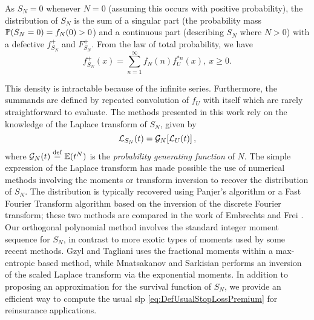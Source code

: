 As $S_N=0$ whenever $N=0$ (assuming this occurs with positive probability), the distribution of $S_N$ is the sum of a singular part (the probability mass $\P(S_N=0)=f_N(0)>0$) and a continuous part (describing $S_N$ where $N>0$) with a defective \pdf $f_{S_N}^+$ and \cdf $F_{S_N}^+$. From the law of total probability, we have
\begin{equation}\label{eq:DefectivePDFCompoundDistribution}
f_{S_N}^+(x)=\sum_{n=1}^{\infty}f_N(n)f_{U}^{\ast n}(x),~x\geq0.
\end{equation}

This density is intractable because of the infinite series. Furthermore, the summands are defined by repeated convolution of $f_{U}$ with itself which are rarely straightforward to evaluate. The methods presented in this work rely on the knowledge of the Laplace transform of $S_N$, given by
\begin{equation*}\label{eq:TransformsForCompoundDistribution}
\LTsub{S_N}(t) = \PGF_N[ \LTsub{U}(t) ] \,,
\end{equation*}
where $\PGF_N(t) \defeq \E (t^N)$ is the \emph{probability generating function} of $N$. The simple expression of the Laplace transform has made possible the use of numerical methods involving the moments or transform inversion to recover the distribution of $S_N$. The distribution is typically recovered using Panjer's algorithm or a Fast Fourier Transform algorithm based on the inversion of the discrete Fourier transform; these two methods are compared in the work of Embrechts and Frei \cite{EmFr09}. Our orthogonal polynomial method involves the standard integer moment sequence for $S_N$, in contrast to more exotic types of moments used by some recent methods. Gzyl and Tagliani \cite{GzTa12} uses the fractional moments within a max-entropic based method, while Mnatsakanov and Sarkisian \cite{MnSa13} performs an inversion of the scaled Laplace transform via the exponential moments. In addition to proposing an approximation for the survival function of $S_N$, we provide an efficient way to compute the usual slp \eqref{eq:DefUsualStopLossPremium} for reinsurance applications.
%
